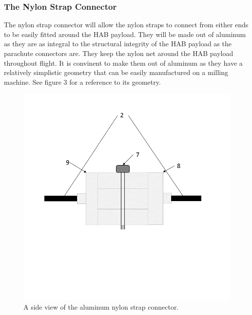 \documentclass[journal]{SPEXformat}
\begin{document}
\subsubsection{The Nylon Strap Connector}
\label{subsubsec: the nylon strap connector}

  The nylon strap connector will allow the nylon straps to connect from either ends to be easily fitted around the HAB
  payload. They will be made out of aluminum as they are as integral to the structural integrity of the HAB payload
  as the parachute connectors are. They keep the nylon net around the HAB payload throughout flight. It is convinent
  to make them out of aluminum as they have a relatively simplistic geometry that can be easily manufactured on a
  milling machine. See figure 3 for a reference to its geometry.

\begin{figure}
  \includegraphics[width = \linewidth]{figs/Nylon-Aluminum-Fixture-Side-Fig.png}
  \caption{A side view of the aluminum nylon strap connector.}
  \label{fig: Nylon Strap Connector}
\end{figure}
\end{document}
